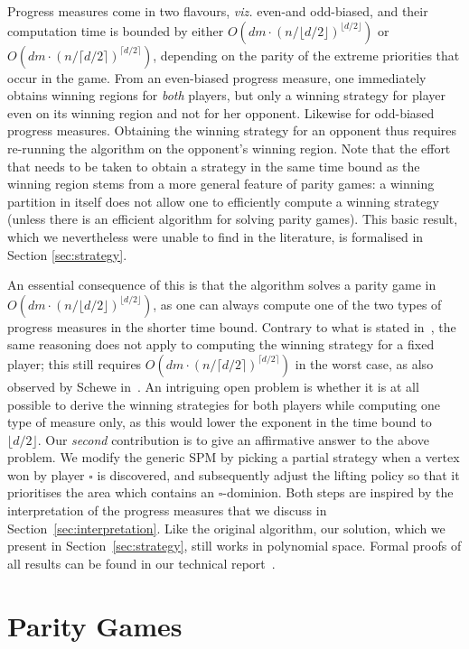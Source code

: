 \documentclass{eptcs}
\newcommand{\odd}{\ensuremath{\square}\xspace}
\newcommand{\viz}{\emph{viz.}\xspace}
\def\runtimeceil{O(dm \cdot (n/\lceil d / 2 \rceil)^{\lceil d/2 \rceil})}
\def\runtimefloor{O(dm \cdot (n/\lfloor d / 2 \rfloor)^{\lfloor d/2 \rfloor})}
\def\floord2{{\lfloor d/2 \rfloor}}
\begin{document}
Progress measures come in two flavours, \viz even-and odd-biased,
and their computation time is bounded by either $\runtimefloor$ or
$\runtimeceil$, depending on the parity of the extreme priorities that
occur in the game.
From an even-biased progress measure, one immediately obtains winning
regions for \emph{both} players, but only a winning strategy for
player even on its winning region and not for her opponent. Likewise
for odd-biased progress measures. Obtaining the winning strategy
for an opponent thus requires re-running the algorithm on the
opponent's winning region.  Note that the effort that needs to be
taken to obtain a strategy in the same time bound as the winning
region stems from a more general feature of parity games: a winning
partition in itself does not allow one to efficiently compute a
winning strategy (unless there is an efficient algorithm for solving
parity games). This basic result, which we nevertheless were unable
to find in the literature, is formalised in Section \ref{sec:strategy}.

An essential consequence of this is that the algorithm solves a
parity game in $\runtimefloor$, as one can always compute one of
the two types of progress measures in the shorter time bound. Contrary
to what is stated in~\cite{Jur:00},
the same reasoning does not apply to computing the winning strategy for
a fixed player; this still requires $\runtimeceil$ in the worst
case,  as also observed by Schewe in~\cite{Sch:07}.
An intriguing open problem is
whether it is at all possible to derive the winning strategies for
both players while computing one type of measure only, as this would
lower the exponent in the time bound to $\floord2$.  Our \emph{second}
contribution is to
give an affirmative answer to the above problem.  We modify the
generic SPM by picking a partial strategy when a vertex won by
player $\odd$ is discovered, and subsequently adjust the lifting
policy so that it prioritises the area which contains an $\odd$-dominion.
Both steps are inspired by the interpretation of the progress measures
that we discuss in Section~\ref{sec:interpretation}.
Like the original algorithm, our solution, which we present in
Section~\ref{sec:strategy}, still works in polynomial
space. 
Formal proofs of all results can be found in our technical report~\cite{GW:14}.
\section{Parity Games}

\label{sec:parity_games}
\end{document}
